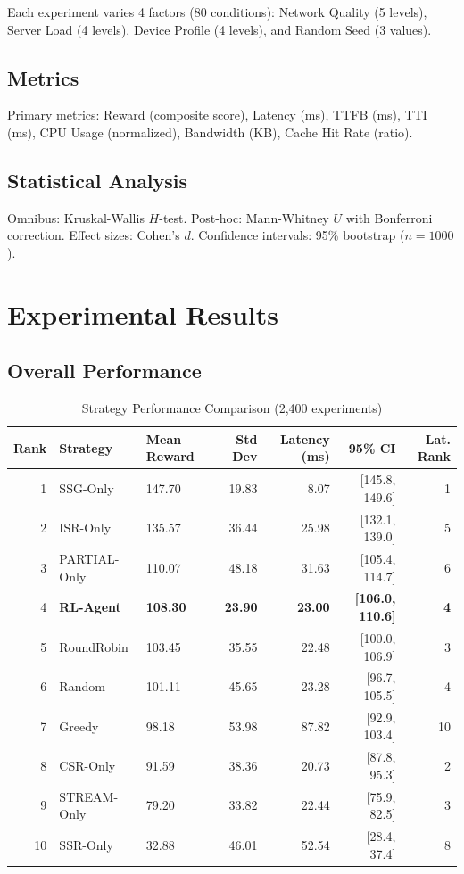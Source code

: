 \documentclass[10pt,twocolumn]{article}
\begin{document}
Each experiment varies 4 factors (80 conditions): Network Quality (5 levels), Server Load (4 levels), Device Profile (4 levels), and Random Seed (3 values).

\subsection{Metrics}

Primary metrics: Reward (composite score), Latency (ms), TTFB (ms), TTI (ms), CPU Usage (normalized), Bandwidth (KB), Cache Hit Rate (ratio).

\subsection{Statistical Analysis}

Omnibus: Kruskal-Wallis $H$-test. Post-hoc: Mann-Whitney $U$ with Bonferroni correction. Effect sizes: Cohen's $d$. Confidence intervals: 95\% bootstrap ($n=1000$).

\section{Experimental Results}
\label{sec:results}

\subsection{Overall Performance}

\begin{table}[t]
\centering
\caption{Strategy Performance Comparison (2,400 experiments)}
\label{tab:performance}
\small
\begin{tabular}{rllrrrr}
\toprule
\textbf{Rank} & \textbf{Strategy} & \textbf{Mean Reward} & \textbf{Std Dev} & \textbf{Latency (ms)} & \textbf{95\% CI} & \textbf{Lat. Rank} \\
\midrule
1 & SSG-Only & 147.70 & 19.83 & 8.07 & [145.8, 149.6] & 1 \\
2 & ISR-Only & 135.57 & 36.44 & 25.98 & [132.1, 139.0] & 5 \\
3 & PARTIAL-Only & 110.07 & 48.18 & 31.63 & [105.4, 114.7] & 6 \\
4 & \textbf{RL-Agent} & \textbf{108.30} & \textbf{23.90} & \textbf{23.00} & \textbf{[106.0, 110.6]} & \textbf{4} \\
5 & RoundRobin & 103.45 & 35.55 & 22.48 & [100.0, 106.9] & 3 \\
6 & Random & 101.11 & 45.65 & 23.28 & [96.7, 105.5] & 4 \\
7 & Greedy & 98.18 & 53.98 & 87.82 & [92.9, 103.4] & 10 \\
8 & CSR-Only & 91.59 & 38.36 & 20.73 & [87.8, 95.3] & 2 \\
9 & STREAM-Only & 79.20 & 33.82 & 22.44 & [75.9, 82.5] & 3 \\
10 & SSR-Only & 32.88 & 46.01 & 52.54 & [28.4, 37.4] & 8 \\
\bottomrule
\end{tabular}
\end{table}
\end{document}
